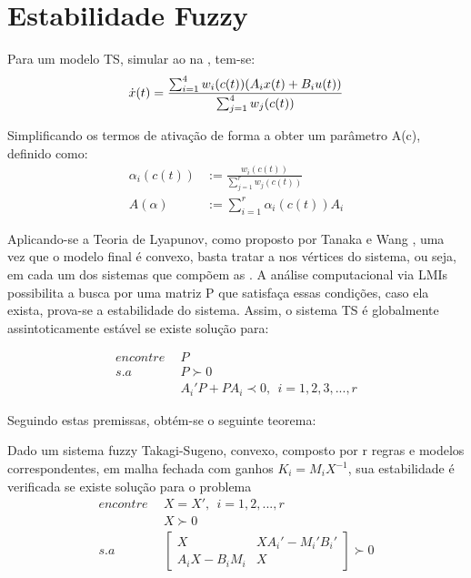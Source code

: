 \section{Estabilidade Fuzzy}
Para um modelo TS, simular ao na , tem-se:
\begin{align*}
	\dot{x}(t) = \frac{\sum_{i=1}^{4}  w_i(c(t))(A_i  x(t) +  B_i  u(t))}{\sum_{j=1}^{4} w_j(c(t))} \vspace{0.5cm}
\end{align*}

Simplificando os termos de ativação de forma a obter um parâmetro A(c), definido como:
\begin{align*}
	\alpha_i (c(t)) &:= \frac{w_i(c(t))}{\sum_{j=1}^{r}w_j(c(t))} \\
	A(\alpha) &:= \sum_{i=1}^{r} \alpha_i (c(t))A_i
\end{align*}

Aplicando-se a Teoria de Lyapunov, como proposto por Tanaka e Wang \cite{wang}, uma vez que o modelo final é convexo, basta tratar a  nos vértices do sistema, ou seja, em cada um dos sistemas que compõem as . 
A análise computacional via LMIs possibilita a busca por uma matriz P que satisfaça essas condições, caso ela exista, prova-se a estabilidade do sistema. Assim, o sistema TS é globalmente assintoticamente estável \cite{tanakaWang} se existe solução para:

\begin{align} \label{eqLyapXk}
	encontre \ \ &P \nonumber \\
	s.a \ \ &P \succ 0 \nonumber \\
	&A_i'P + P A_i \prec 0, \ \ i=1,2,3, ... , r
\end{align}

Seguindo estas premissas, obtém-se o seguinte teorema:
\begin{myteo} \label{teoControlador}
Dado um sistema fuzzy Takagi-Sugeno, convexo, composto por r regras e modelos correspondentes, em malha fechada com ganhos $K_i = M_i X^{-1}$, sua estabilidade é verificada \cite{wang} se existe solução para o problema
	\begin{align} \label{eqContFuzzy}
		encontre \ \ &X = X', \ \ i = 1,2,...,r \nonumber \\
		&X \succ 0 \nonumber \\
		s.a \ \ & 
		\begin{bmatrix}
			X	&	XA_i' - M_i'B_i'  \\
			A_iX - B_iM_i &	X
		\end{bmatrix} \succ 0 \nonumber \\
	\end{align}
\end{myteo}

%

